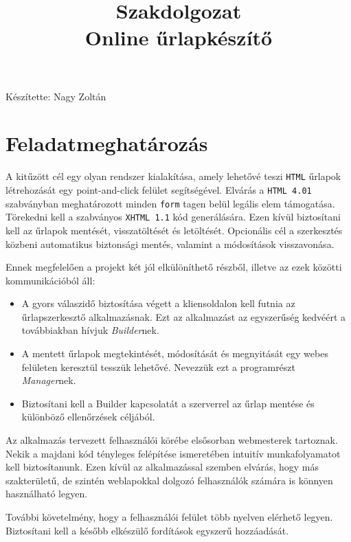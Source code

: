 \documentclass[12pt,a4paper,twoside]{article}
\title{Szakdolgozat\\\normalsize Online űrlapkészítő}
\author{} %
\begin{document}
\maketitle\thispagestyle{empty}
\vspace{17cm}
\hspace{8cm}
Készítette: Nagy Zoltán
\clearpage

\setcounter{tocdepth}{3}
\tableofcontents

\clearpage
{}
\section{Feladatmeghatározás}

A kitűzött cél egy olyan rendszer kialakítása, amely lehetővé teszi
\texttt{HTML} űrlapok létrehozását egy point-and-click felület
segítségével. Elvárás a \texttt{HTML 4.01} szabványban meghatározott minden
\texttt{form} tagen belül legális elem támogatása. Törekedni kell a szabványos
\texttt{XHTML 1.1} kód generálására. Ezen kívül biztosítani kell
az űrlapok mentését, visszatöltését és letöltését. Opcionális cél a szerkesztés
közbeni automatikus biztonsági mentés, valamint a módosítások visszavonása.

Ennek megfelelően a projekt két jól elkülöníthető részből, illetve az ezek
közötti kommunikációból áll:
\begin{itemize}
\item A gyors válaszidő biztosítása végett a kliensoldalon kell futnia az
  űrlapszerkesztő alkalmazásnak. Ezt az alkalmazást az egyszerűség kedvéért a
  továbbiakban hívjuk \textit{Builder}nek.
\item A mentett űrlapok megtekintését, módosítását és megnyitását egy
  webes felületen keresztül tesszük lehetővé. Nevezzük ezt a programrészt
  \textit{Manager}nek.
\item Biztosítani kell a Builder kapcsolatát a szerverrel az űrlap mentése és
  különböző ellenőrzések céljából.
\end{itemize}

Az alkalmazás tervezett felhasználói körébe elsősorban webmesterek
tartoznak. Nekik a majdani kód tényleges felépítése ismeretében intuitív munkafolyamatot
kell biztosítanunk. Ezen kívül az alkalmazással szemben elvárás, hogy más
szakterületű, de szintén weblapokkal dolgozó felhasználók számára is könnyen
használható legyen.

További követelmény, hogy a felhasználói felület több nyelven elérhető
legyen. Biztosítani kell a később elkészülő fordítások egyszerű hozzáadását.
\end{document}
